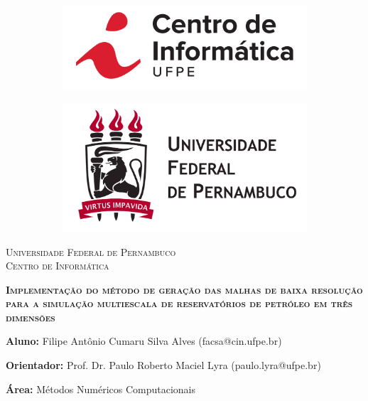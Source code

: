 \documentclass[a4paper, 10pt]{article}
\begin{document}
\thispagestyle{empty}

\begin{figure}[!ht]
	\centering
	\begin{subfigure}[b]{0.3\textwidth}
         \centering
         \includegraphics[width=\textwidth]{Horizontal Vermelho - Logotipo CIn-UFPE.png}
     \end{subfigure}
     \begin{subfigure}[b]{0.3\textwidth}
         \centering
         \includegraphics[width=\textwidth]{logo_ufpe.png}
     \end{subfigure}
\end{figure}

\Large\begin{center}
    {\textsc{Universidade Federal de Pernambuco \\ Centro de Informática}}
\end{center}

\vspace{4cm}
\begin{center}
	\huge{\textsc{\textbf{
	    Implementação do método de geração das malhas de baixa resolução para a simulação multiescala de reservatórios de petróleo em três dimensões
	}}}
\end{center}
\vspace{5cm}

\begin{center}
    \textbf{Aluno:} Filipe Antônio Cumaru Silva Alves (facsa@cin.ufpe.br)
\end{center}
\begin{center}
    \textbf{Orientador:} Prof. Dr. Paulo Roberto Maciel Lyra (paulo.lyra@ufpe.br)
\end{center}
\begin{center}
    \textbf{Área:} Métodos Numéricos Computacionais
\end{center}
\end{document}
